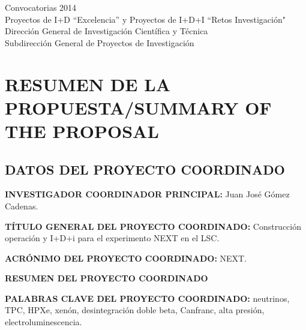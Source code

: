 \documentclass[a4paper,11pt,oneside]{article}
\begin{document}


\begin{center}
{\Large \textsf{Convocatorias 2014}} \\ \vspace{0.3cm}
{\Large  \textsf{Proyectos de I+D ``Excelencia'' y Proyectos de I+D+I ``Retos Investigación"}} \\ 
{\Large \textsf{Dirección General de Investigación Científica y Técnica}} \\
{\Large \textsf{Subdirección General de Proyectos de Investigación }} \\ 
\end{center}


\section{\bf \textsf{RESUMEN DE LA PROPUESTA/SUMMARY OF THE PROPOSAL}}
\subsection{DATOS DEL PROYECTO COORDINADO}

{\sc \bf INVESTIGADOR COORDINADOR PRINCIPAL:} Juan José Gómez Cadenas.
\vspace{0.3cm}

{\sc \bf TÍTULO GENERAL DEL PROYECTO COORDINADO:} Construcción operación y I+D+i para el experimento NEXT en el LSC.
\vspace{0.3cm}

{\sc \bf ACRÓNIMO DEL PROYECTO COORDINADO:} NEXT.
\vspace{0.3cm}

{\sc \bf  RESUMEN DEL PROYECTO COORDINADO} 
\vspace{0.3cm}

 
 \vspace{0.3cm}

{\sc \bf PALABRAS CLAVE DEL PROYECTO COORDINADO:} neutrinos, TPC, HPXe, xenón, desintegración doble beta, Canfranc, alta presión, electroluminescencia. 
\end{document}
